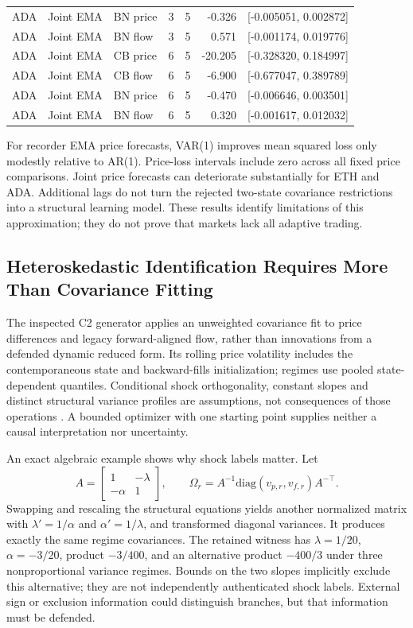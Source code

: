 \begin{longtable}{lllrrrl}
ADA & Joint EMA & BN price & 3 & 5 & -0.326 & [-0.005051, 0.002872]\\
ADA & Joint EMA & BN flow & 3 & 5 & 0.571 & [-0.001174, 0.019776]\\
ADA & Joint EMA & CB price & 6 & 5 & -20.205 & [-0.328320, 0.184997]\\
ADA & Joint EMA & CB flow & 6 & 5 & -6.900 & [-0.677047, 0.389789]\\
ADA & Joint EMA & BN price & 6 & 5 & -0.470 & [-0.006646, 0.003501]\\
ADA & Joint EMA & BN flow & 6 & 5 & 0.320 & [-0.001617, 0.012032]\\
\end{longtable}

For recorder EMA price forecasts, VAR(1) improves mean squared loss only modestly relative to AR(1). Price-loss intervals include zero across all fixed price comparisons. Joint price forecasts can deteriorate substantially for ETH and ADA. Additional lags do not turn the rejected two-state covariance restrictions into a structural learning model. These results identify limitations of this approximation; they do not prove that markets lack all adaptive trading.

\subsection{Heteroskedastic Identification Requires More Than Covariance Fitting}
The inspected C2 generator applies an unweighted covariance fit to price differences and legacy forward-aligned flow, rather than innovations from a defended dynamic reduced form. Its rolling price volatility includes the contemporaneous state and backward-fills initialization; regimes use pooled state-dependent quantiles. Conditional shock orthogonality, constant slopes and distinct structural variance profiles are assumptions, not consequences of those operations \citep{rigobon2003identification}. A bounded optimizer with one starting point supplies neither a causal interpretation nor uncertainty.

An exact algebraic example shows why shock labels matter. Let
\[
A=\begin{bmatrix}1&-\lambda\\-\alpha&1\end{bmatrix},\qquad
\Omega_r=A^{-1}\mathrm{diag}(v_{p,r},v_{f,r})A^{-\top}.
\]
Swapping and rescaling the structural equations yields another normalized matrix with $\lambda'=1/\alpha$ and $\alpha'=1/\lambda$, and transformed diagonal variances. It produces exactly the same regime covariances. The retained witness has $\lambda=1/20$, $\alpha=-3/20$, product $-3/400$, and an alternative product $-400/3$ under three nonproportional variance regimes. Bounds on the two slopes implicitly exclude this alternative; they are not independently authenticated shock labels. External sign or exclusion information could distinguish branches, but that information must be defended.

